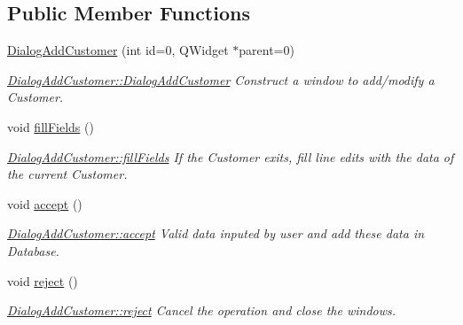 \subsection*{Public Member Functions}
\begin{DoxyCompactItemize}
\item 
\hyperlink{classGui_1_1Dialogs_1_1DialogAddCustomer_a7ac689e5bcf3c4e28426016b5a2f1478}{Dialog\-Add\-Customer} (int id=0, Q\-Widget $\ast$parent=0)
\begin{DoxyCompactList}\small\item\em \hyperlink{classGui_1_1Dialogs_1_1DialogAddCustomer_a7ac689e5bcf3c4e28426016b5a2f1478}{Dialog\-Add\-Customer\-::\-Dialog\-Add\-Customer} Construct a window to add/modify a Customer. \end{DoxyCompactList}\item 
\hypertarget{classGui_1_1Dialogs_1_1DialogAddCustomer_a25d53880ea053c960ee621fec29afb36}{void \hyperlink{classGui_1_1Dialogs_1_1DialogAddCustomer_a25d53880ea053c960ee621fec29afb36}{fill\-Fields} ()}\label{classGui_1_1Dialogs_1_1DialogAddCustomer_a25d53880ea053c960ee621fec29afb36}

\begin{DoxyCompactList}\small\item\em \hyperlink{classGui_1_1Dialogs_1_1DialogAddCustomer_a25d53880ea053c960ee621fec29afb36}{Dialog\-Add\-Customer\-::fill\-Fields} If the Customer exits, fill line edits with the data of the current Customer. \end{DoxyCompactList}\item 
\hypertarget{classGui_1_1Dialogs_1_1DialogAddCustomer_ab9f488af3fdfbf0ca9851cc59946dd5d}{void \hyperlink{classGui_1_1Dialogs_1_1DialogAddCustomer_ab9f488af3fdfbf0ca9851cc59946dd5d}{accept} ()}\label{classGui_1_1Dialogs_1_1DialogAddCustomer_ab9f488af3fdfbf0ca9851cc59946dd5d}

\begin{DoxyCompactList}\small\item\em \hyperlink{classGui_1_1Dialogs_1_1DialogAddCustomer_ab9f488af3fdfbf0ca9851cc59946dd5d}{Dialog\-Add\-Customer\-::accept} Valid data inputed by user and add these data in Database. \end{DoxyCompactList}\item 
\hypertarget{classGui_1_1Dialogs_1_1DialogAddCustomer_a5f3b96e858dedc8a54ff184baafd6e90}{void \hyperlink{classGui_1_1Dialogs_1_1DialogAddCustomer_a5f3b96e858dedc8a54ff184baafd6e90}{reject} ()}\label{classGui_1_1Dialogs_1_1DialogAddCustomer_a5f3b96e858dedc8a54ff184baafd6e90}

\begin{DoxyCompactList}\small\item\em \hyperlink{classGui_1_1Dialogs_1_1DialogAddCustomer_a5f3b96e858dedc8a54ff184baafd6e90}{Dialog\-Add\-Customer\-::reject} Cancel the operation and close the windows. \end{DoxyCompactList}\end{DoxyCompactItemize}



